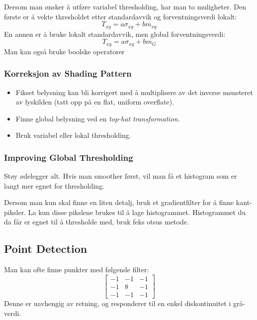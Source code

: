 Dersom man ønsker å utføre variabel thresholding, har man to muligheter. Den første er å vekte thresholdet etter standardavvik og forventningsverdi lokalt:
\begin{equation}
    T_{xy} = a\sigma_{xy} + b m_{xy}
\end{equation}
En annen er å bruke lokalt standardavvik, men global forventningsverdi:
\begin{equation}
    T_{xy} = a\sigma_{xy} + b m_{G}
\end{equation}
Man kan også bruke boolske operatorer

\subsubsection{Korreksjon av Shading Pattern}
\begin{itemize}
    \item Fikset belysning kan bli korrigert med å multiplisere av det inverse mønsteret av lyskilden (tatt opp på en flat, uniform overflate).
    \item Finne global belysning ved en \emph{top-hat transformation}.
    \item Bruk variabel eller lokal thresholding.
\end{itemize}

\subsubsection{Improving Global Thresholding}
Støy ødelegger alt. Hvis man smoother først, vil man få et histogram som er langt mer egnet for thresholding.

Dersom man kun skal finne en liten detalj, bruk et gradientfilter for å finne kant-piksler. La kun disse pikslene brukes til å lage histogrammet. Histogrammet du da får er egnet til å thresholde med, bruk feks otsus metode.

\subsection{Point Detection}
Man kan ofte finne punkter med følgende filter:
\begin{equation}
    \begin{bmatrix}
        -1 & -1 & -1 \\
        -1 & 8 & -1 \\
        -1 & -1 & -1
    \end{bmatrix}
\end{equation}
Denne er uavhengig av retning, og responderer til en enkel diskontinuitet i grå-verdi.

